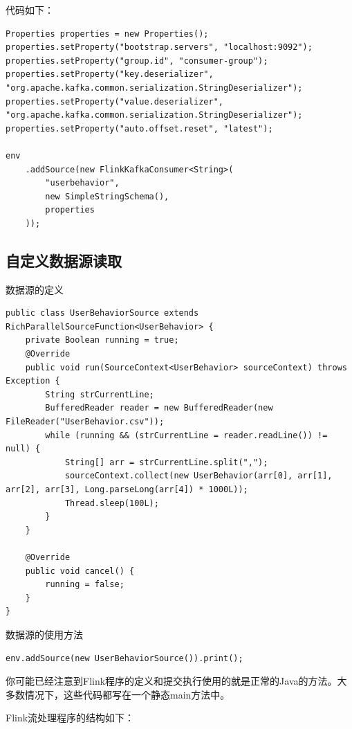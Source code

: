 \documentclass[cn,11pt,chinese]{elegantbook}
\begin{document}
代码如下：

\begin{verbatim}
Properties properties = new Properties();
properties.setProperty("bootstrap.servers", "localhost:9092");
properties.setProperty("group.id", "consumer-group");
properties.setProperty("key.deserializer", "org.apache.kafka.common.serialization.StringDeserializer");
properties.setProperty("value.deserializer", "org.apache.kafka.common.serialization.StringDeserializer");
properties.setProperty("auto.offset.reset", "latest");

env
    .addSource(new FlinkKafkaConsumer<String>(
        "userbehavior",
        new SimpleStringSchema(),
        properties
    ));
\end{verbatim}

\subsection{自定义数据源读取}

数据源的定义

\begin{verbatim}
public class UserBehaviorSource extends RichParallelSourceFunction<UserBehavior> {
    private Boolean running = true;
    @Override
    public void run(SourceContext<UserBehavior> sourceContext) throws Exception {
        String strCurrentLine;
        BufferedReader reader = new BufferedReader(new FileReader("UserBehavior.csv"));
        while (running && (strCurrentLine = reader.readLine()) != null) {
            String[] arr = strCurrentLine.split(",");
            sourceContext.collect(new UserBehavior(arr[0], arr[1], arr[2], arr[3], Long.parseLong(arr[4]) * 1000L));
            Thread.sleep(100L);
        }
    }
    
    @Override
    public void cancel() {
        running = false;
    }
}
\end{verbatim}

数据源的使用方法

\begin{verbatim}
env.addSource(new UserBehaviorSource()).print();
\end{verbatim}

你可能已经注意到Flink程序的定义和提交执行使用的就是正常的Java的方法。大多数情况下，这些代码都写在一个静态main方法中。

Flink流处理程序的结构如下：
\end{document}
